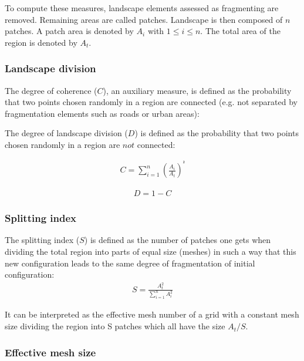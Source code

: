 \documentclass[11pt]{article}
\begin{document}
To compute these measures, landscape elements assessed as fragmenting are removed. Remaining areas are called patches. Landscape is then composed of $n$ patches. A patch area is denoted by $A_i$ with $1 \leq i \leq n$. The total area of the region is denoted by $A_t$.

\subsubsection{Landscape division}

The degree of coherence ($C$), an auxiliary measure, is defined as the probability that two points chosen randomly in a region are connected (e.g. not separated by fragmentation elements such as roads or urban areas):

The degree of landscape division ($D$) is defined as the probability that two points chosen randomly in a region are $not$ connected:

\hspace*{-0.5cm}
\begin{minipage}[c][1cm]{.46\linewidth}
\begin{align*}
C = \sum_{i=1}^{n}(\frac{A_{i}}{A_{t}})^{²}
\end{align*}
\end{minipage}
\begin{minipage}[c][1cm]{.46\linewidth}
\begin{align*}
D = 1 - C
\end{align*}
\end{minipage}

\subsubsection{Splitting index}

The  splitting index ($S$) is defined as the number of patches one gets when dividing the total region into parts of equal size (meshes) in such a way that this new configuration leads to the same degree of fragmentation of initial configuration:
\begin{align*}
S = \frac{A_{t}^{2}}{\sum_{i=1}^{n}A_{i}^{2}}
\end{align*}

It can be interpreted as the effective mesh number of a grid with a constant mesh size dividing the region into S patches which all have the size $A_{t} / S$.

\subsubsection{Effective mesh size}
\end{document}
